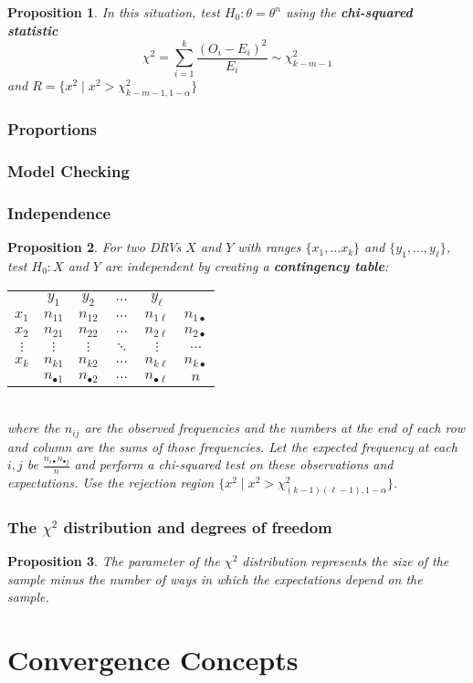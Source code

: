 \documentclass[12pt]{article}
\newtheorem*{prop*}{Proposition}
\theoremstyle{definition}
\begin{document}
\begin{prop*}
  In this situation, test $H_0 : \theta = \theta^n$ using the \textbf{chi-squared statistic}
  $$\chi^2 = \sum_{i = 1}^k\frac{(O_i - E_i)^2}{E_i} \sim \chi^2_{k - m - 1}$$
  and $R = \{x^2 \mid x^2 > \chi^2_{k - m - 1,1-\alpha}\}$
\end{prop*}

\subsubsection{Proportions}

\subsubsection{Model Checking}

\subsubsection{Independence}

\begin{prop*}
  For two DRVs $X$ and $Y$ with ranges $\{x_1, \ldots x_k\}$ and $\{y_1, \ldots, y_\ell\}$, test $H_0 : X$ and $Y$ are independent by creating a \textbf{contingency table}:\\
  \begin{tabular}{cccccc}
             & $y_1$           & $y_2$           & $\ldots$ & $y_\ell$          &\\
    $x_1$    & $n_{11}$        & $n_{12}$        & $\ldots$ & $n_{1\ell}$       & $n_{1\bullet}$\\
    $x_2$    & $n_{21}$        & $n_{22}$        & $\ldots$ & $n_{2\ell}$       & $n_{2\bullet}$\\
    $\vdots$ & $\vdots$        & $\vdots$        & $\ddots$ & $\vdots$          & $\ldots$\\
    $x_k$    & $n_{k1}$        & $n_{k2}$        & $\ldots$ & $n_{k\ell}$       & $n_{k\bullet}$\\
             & $n_{\bullet 1}$ & $n_{\bullet 2}$ & $\ldots$ & $n_{\bullet\ell}$ & $n$
  \end{tabular}\\
  where the $n_{ij}$ are the observed frequencies and the numbers at the end of each row and column are the sums of those frequencies.
  Let the expected frequency at each $i, j$ be $\frac{n_{i\bullet}n_{\bullet j}}{n}$ and perform a chi-squared test on these observations and expectations.
  Use the rejection region $\{x^2 \mid x^2 > \chi^2_{(k - 1)(\ell - 1),1-\alpha}\}$.
\end{prop*}

\subsubsection{The $\chi^2$ distribution and degrees of freedom}

\begin{prop*}
  The parameter of the $\chi^2$ distribution represents the size of the sample minus the number of ways in which the expectations depend on the sample.
\end{prop*}

\section{Convergence Concepts}
\end{document}
